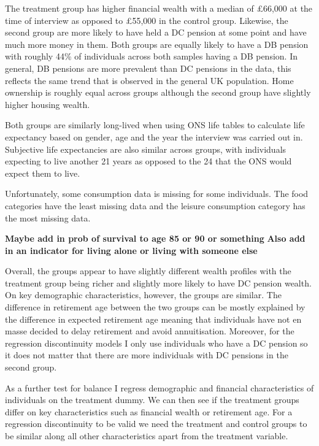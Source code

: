 \documentclass[12pt]{article}
\begin{document}
The treatment group has higher financial wealth with a median of £66,000 at the
time of interview as opposed to £55,000 in the control group. Likewise, the
second group are more likely to have held a DC pension at some point and have
much more money in them. Both groups are equally likely to have a DB pension
with roughly 44\% of individuals across both samples having a DB pension. In
general, DB pensions are more prevalent than DC pensions in the data, this
reflects the same trend that is observed in the general UK population. Home
ownership is roughly equal across groups although the second group have slightly
higher housing wealth.

Both groups are similarly long-lived when using ONS life tables to calculate
life expectancy based on gender, age and the year the interview was carried out
in. Subjective life expectancies are also similar across groups, with
individuals expecting to live another 21 years as opposed to the 24 that the ONS
would expect them to live.

Unfortunately, some consumption data is missing for some individuals. The food
categories have the least missing data and the leisure consumption category has
the most missing data.


\textbf{Maybe add in prob of survival to age 85 or 90 or something}
\textbf{Also add in an indicator for living alone or living with someone else}

Overall, the groups appear to have slightly different wealth profiles with the
treatment group being richer and slightly more likely to have DC pension wealth.
On key demographic characteristics, however, the groups are similar. The
difference in retirement age between the two groups can be mostly explained by
the difference in expected retirement age meaning that individuals have not en
masse decided to delay retirement and avoid annuitisation. Moreover, for the
regression discontinuity models I only use individuals who have a DC pension so
it does not matter that there are more individuals with DC pensions in the
second group.
\begin{landscape}
    \tiny
    
    \normalsize
\end{landscape}


As a further test for balance I regress demographic and financial
characteristics of individuals on the treatment dummy. We can then see if the
treatment groups differ on key characteristics such as financial wealth or
retirement age. For a regression discontinuity to be valid we need the treatment
and control groups to be similar along all other characteristics apart from the
treatment variable.
\end{document}
